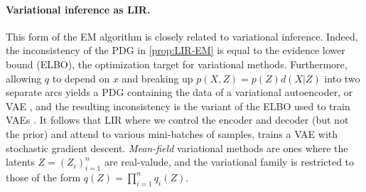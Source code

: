 \documentclass[twoside]{article}
\let\cite\citep
\theoremstyle{plain}
\theoremstyle{definition}
\theoremstyle{remark}
\begin{document}
\paragraph{Variational inference as LIR.}
This form of the EM algorithm is closely related to variational inference.
Indeed, the inconsistency of the PDG in \cref{prop:LIR-EM} is equal to the evidence lower bound (ELBO), the optimization target for variational methods.
Furthermore, allowing $q$ to depend on $x$ 
and breaking up $p(X,Z) = p(Z)d(X|Z)$ into two separate arcs yields a PDG containing the data of a variational autoencoder, or VAE \cite{kingma2013autoencoding}, and the resulting inconsistency is the variant of the ELBO used to train VAEs \cite{one-true-loss}.  It follows that LIR where we control the encoder and decoder (but not the prior) and attend to various mini-batches of samples, trains a VAE with stochastic gradient descent. 
%
\emph{Mean-field} variational methods are ones where the latents $Z = (Z_i)_{i=1}^n$ are real-valude, and the variational family is restricted to those of the form $q(Z) = \prod_{i=1}^n q_i(Z)$.
\end{document}
